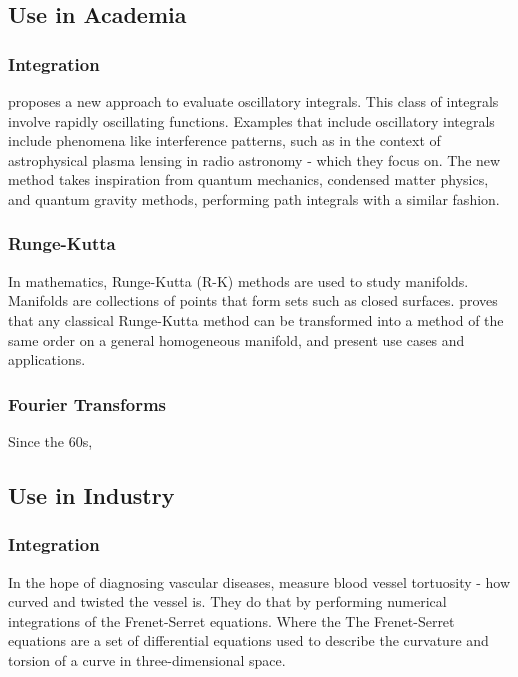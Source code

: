 \documentclass[fleqn,usenatbib]{mnras}
\begin{document}
\subsection{Use in Academia}

\subsubsection{Integration}
\cite{feldbrugge2023oscillatory} proposes a new approach to evaluate oscillatory integrals. This class of integrals involve rapidly oscillating functions. Examples that include oscillatory integrals include phenomena like interference patterns, such as in the context of astrophysical plasma lensing in radio astronomy - which they focus on. The new method takes inspiration from quantum mechanics, condensed matter physics, and quantum gravity methods, performing path integrals with a similar fashion.

\subsubsection{Runge-Kutta}

In mathematics, Runge-Kutta (R-K) methods are used to study manifolds. Manifolds are collections of points that form sets such as closed surfaces. \cite{munthe1999high} proves that any classical Runge-Kutta method can be transformed into a method of the same order on a general homogeneous manifold, and present use cases and applications.





\subsubsection{Fourier Transforms}

Since the 60s, \cite{ables1968fourier}


\subsection{Use in Industry}
\subsubsection{Integration}

In the hope of diagnosing vascular diseases, \cite{brummer2020improving} measure blood vessel tortuosity - how curved and twisted the vessel is. They do that by performing numerical integrations of the Frenet-Serret equations. Where the The Frenet-Serret equations are a set of differential equations used to describe the curvature and torsion of a curve in three-dimensional space.
\end{document}
